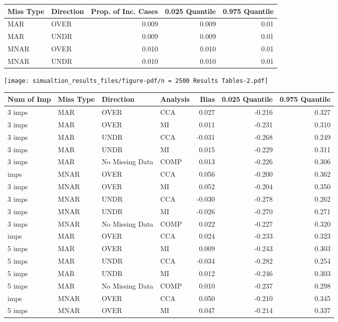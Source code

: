 \documentclass[
  letterpaper,
  DIV=11,
  numbers=noendperiod]{scrartcl}
\begin{document}
\begin{tabular}[t]{llrrr}
\toprule
Miss Type & Direction & Prop. of Inc. Cases & 0.025 Quantile & 0.975 Quantile\\
\midrule
MAR & OVER & 0.009 & 0.009 & 0.01\\
MAR & UNDR & 0.009 & 0.009 & 0.01\\
MNAR & OVER & 0.010 & 0.010 & 0.01\\
MNAR & UNDR & 0.010 & 0.010 & 0.01\\
\bottomrule
\end{tabular}

\texttt{[image: simualtion\_results\_files/figure-pdf/n = 2500 Results Tables-2.pdf]}

\begin{tabular}[t]{llllrrr}
\toprule
Num of Imp & Miss Type & Direction & Analysis & Bias & 0.025 Quantile & 0.975 Quantile\\
\midrule
3 imps & MAR & OVER & CCA & 0.027 & -0.216 & 0.327\\
3 imps & MAR & OVER & MI & 0.011 & -0.231 & 0.310\\
3 imps & MAR & UNDR & CCA & -0.031 & -0.268 & 0.249\\
3 imps & MAR & UNDR & MI & 0.015 & -0.229 & 0.311\\
3 imps & MAR & No Missing Data & COMP & 0.013 & -0.226 & 0.306\\
\addlinespace
3 imps & MNAR & OVER & CCA & 0.056 & -0.200 & 0.362\\
3 imps & MNAR & OVER & MI & 0.052 & -0.204 & 0.350\\
3 imps & MNAR & UNDR & CCA & -0.030 & -0.278 & 0.262\\
3 imps & MNAR & UNDR & MI & -0.026 & -0.270 & 0.271\\
3 imps & MNAR & No Missing Data & COMP & 0.022 & -0.227 & 0.320\\
\addlinespace
5 imps & MAR & OVER & CCA & 0.024 & -0.233 & 0.323\\
5 imps & MAR & OVER & MI & 0.009 & -0.243 & 0.303\\
5 imps & MAR & UNDR & CCA & -0.034 & -0.282 & 0.254\\
5 imps & MAR & UNDR & MI & 0.012 & -0.246 & 0.303\\
5 imps & MAR & No Missing Data & COMP & 0.010 & -0.237 & 0.298\\
\addlinespace
5 imps & MNAR & OVER & CCA & 0.050 & -0.210 & 0.345\\
5 imps & MNAR & OVER & MI & 0.047 & -0.214 & 0.337\\

\end{tabular}
\end{document}
